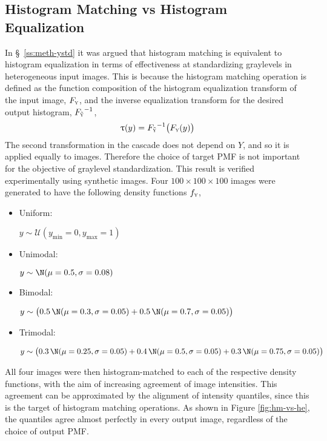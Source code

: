 \subsection{Histogram Matching vs Histogram Equalization}\label{ss:hm-vs-he}
In \S\ \ref{ss:meth-ystd} it was argued that histogram matching is equivalent to histogram equalization in terms of effectiveness at standardizing graylevels in heterogeneous input images.
This is because the histogram matching operation is defined as the function composition of the histogram equalization transform of the input image, $F_{\textsc{y}}$, and the inverse equalization transform for the desired output histogram, ${F_{\tilde{\textsc{y}}}}^{-1}$,
\begin{equation}
  \uptau(y) = {F_{\tilde{\textsc{y}}}}^{-1}\big(F_{\textsc{y}}(y)\big)
\end{equation}
The second transformation in the cascade does not depend on $Y$, and so it is applied equally to images.
Therefore the choice of target PMF is not important for the objective of graylevel standardization.
This result is verified experimentally using synthetic images.
Four $100\times100\times100$ images were generated to have the following density functions $f_{\textsc{y}}$,
\begin{itemize}[itemsep=0pt,topsep=0pt]
  \item \parbox{2cm}{Uniform:} $y\sim\mathcal{U}(y_{\min}=0,y_{\max}=1)$
  \item \parbox{2cm}{Unimodal:} $y\sim\N(\mu=0.5,\sigma=0.08)$
  \item \parbox{2cm}{Bimodal:} $y\sim\big(0.5\et\N(\mu=0.3,\sigma=0.05)+0.5\et\N(\mu=0.7,\sigma=0.05)\big)$
  \item \parbox{2cm}{Trimodal:} $y\sim\big(0.3\et\N(\mu=0.25,\sigma=0.05)+0.4\et\N(\mu=0.5,\sigma=0.05)+0.3\et\N(\mu=0.75,\sigma=0.05)\big)$
\end{itemize}
All four images were then histogram-matched to each of the respective density functions, with the aim of increasing agreement of image intensities.
This agreement can be approximated by the alignment of intensity quantiles, since this is the target of histogram matching operations.
As shown in Figure \ref{fig:hm-vs-he}, the quantiles agree almost perfectly in every output image, regardless of the choice of output PMF.
